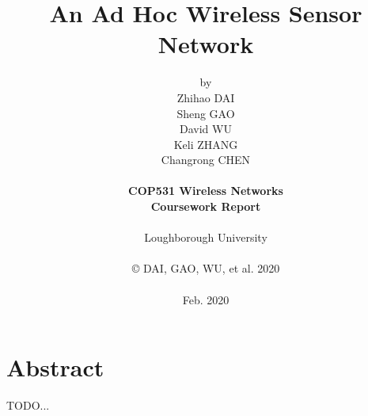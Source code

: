 \title{\bf An Ad Hoc Wireless Sensor Network}

\author{by\\
Zhihao DAI\\
Sheng GAO\\
David WU\\
Keli ZHANG\\
Changrong CHEN\\
\\
{\bf COP531 Wireless Networks}\\
{\bf Coursework Report}\\
\\
Loughborough University\\
\\
\copyright
\hspace{1 dd} DAI, GAO, WU, et al. 2020\\
\\
Feb. 2020
}
\date{} %

\maketitle


% 
% 

\chapter*{Abstract}
TODO...



\setcounter{tocdepth}{2}
\tableofcontents

